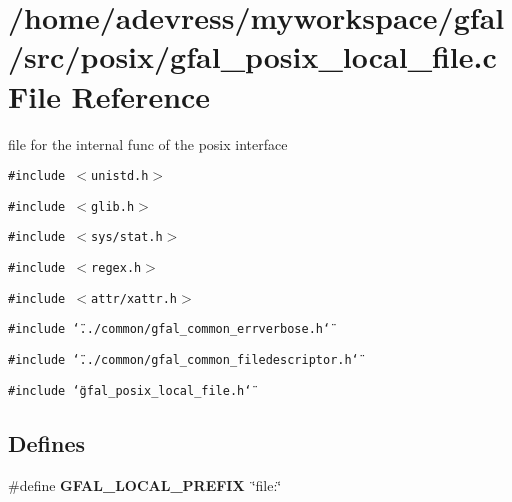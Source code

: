 \section{/home/adevress/myworkspace/gfal/src/posix/gfal\_\-posix\_\-local\_\-file.c File Reference}
\label{gfal__posix__local__file_8c}
file for the internal func of the posix interface 

{\tt \#include $<$unistd.h$>$}\par
{\tt \#include $<$glib.h$>$}\par
{\tt \#include $<$sys/stat.h$>$}\par
{\tt \#include $<$regex.h$>$}\par
{\tt \#include $<$attr/xattr.h$>$}\par
{\tt \#include \char`\"{}../common/gfal\_\-common\_\-errverbose.h\char`\"{}}\par
{\tt \#include \char`\"{}../common/gfal\_\-common\_\-filedescriptor.h\char`\"{}}\par
{\tt \#include \char`\"{}gfal\_\-posix\_\-local\_\-file.h\char`\"{}}\par
\subsection*{Defines}
\begin{CompactItemize}
\item 
\#define \textbf{GFAL\_\-LOCAL\_\-PREFIX}~\char`\"{}file:\char`\"{}\label{gfal__posix__local__file_8c_72e3f23638773071a6db4d9a354ccfdb}

\end{CompactItemize}
